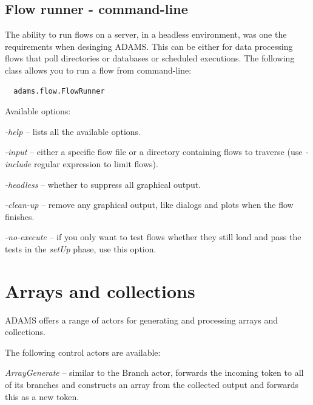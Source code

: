\subsection{Flow runner - command-line}
The ability to run flows on a server, in a headless environment, was one the
requirements when desinging ADAMS. This can be either for data processing
flows that poll directories or databases or scheduled executions. The following
class allows you to run a flow from command-line:
\begin{verbatim}
  adams.flow.FlowRunner
\end{verbatim}
Available options:
\begin{tight_itemize}
	\item \textit{-help} -- lists all the available options.
	\item \textit{-input} -- either a specific flow file or a directory containing
	flows to traverse (use \textit{-include} regular expression to limit flows).
	\item \textit{-headless} -- whether to suppress all graphical output.
	\item \textit{-clean-up} -- remove any graphical output, like dialogs and
	plots when the flow finishes.
	\item \textit{-no-execute} -- if you only want to test flows whether they
	still load and pass the tests in the \textit{setUp} phase, use this option.
\end{tight_itemize}

\clearpage
\section{Arrays and collections}
\label{arrays_and_collections}
ADAMS offers a range of actors for generating and processing arrays and
collections.

\noindent The following control actors are available:
\begin{tight_itemize}
	\item \textit{ArrayGenerate} -- similar to the Branch actor, forwards
	the incoming token to all of its branches and constructs an array from
	the collected output and forwards this as a new token.
\end{tight_itemize}

